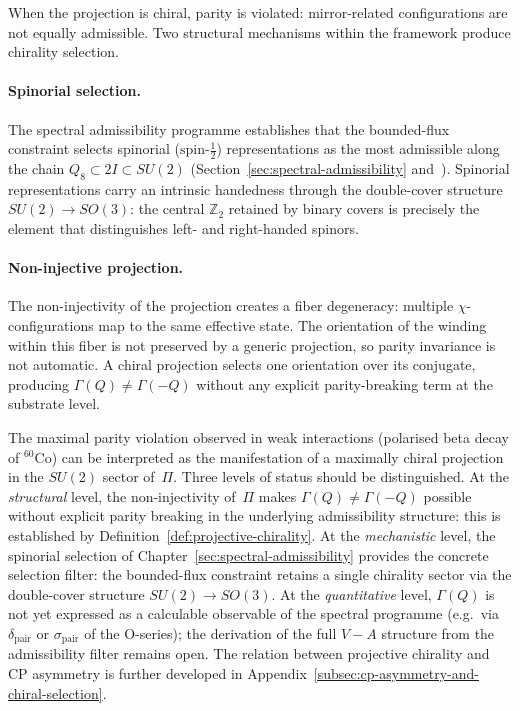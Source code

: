     When the projection is chiral, parity is violated: mirror-related
    configurations are not equally admissible.
    Two structural mechanisms within the framework produce chirality selection.

    \paragraph{Spinorial selection.}
      The spectral admissibility programme establishes that the bounded-flux
      constraint selects spinorial ($\mathrm{spin}$-$\tfrac{1}{2}$) representations
      as the most admissible along the chain $Q_8 \subset 2I \subset SU(2)$
      (Section~\ref{sec:spectral-admissibility} and~\cite{Beau2026a1}).
      Spinorial representations carry an intrinsic handedness through the
      double-cover structure $SU(2) \to SO(3)$: the central $\mathbb{Z}_2$
      retained by binary covers is precisely the element that distinguishes
      left- and right-handed spinors.

    \paragraph{Non-injective projection.}
      The non-injectivity of the projection creates a fiber degeneracy:
      multiple $\chi$-configurations map to the same effective state.
      The orientation of the winding within this fiber is not preserved by a
      generic projection, so parity invariance is not automatic.
      A chiral projection selects one orientation over its conjugate, producing
      $\Gamma(Q) \neq \Gamma(-Q)$ without any explicit parity-breaking term at
      the substrate level.

      The maximal parity violation observed in weak interactions (polarised beta
      decay of ${}^{60}\mathrm{Co}$) can be interpreted as the manifestation of a
      maximally chiral projection in the $SU(2)$ sector of~$\Pi$.
      Three levels of status should be distinguished.
      At the \emph{structural} level, the non-injectivity of~$\Pi$ makes
      $\Gamma(Q) \neq \Gamma(-Q)$ possible without explicit parity breaking
      in the underlying admissibility structure: this is established by
      Definition~\ref{def:projective-chirality}.
      At the \emph{mechanistic} level, the spinorial selection of
      Chapter~\ref{sec:spectral-admissibility} provides the concrete selection
      filter: the bounded-flux constraint retains a single chirality sector
      via the double-cover structure $SU(2) \to SO(3)$.
      At the \emph{quantitative} level, $\Gamma(Q)$ is not yet expressed as a
      calculable observable of the spectral programme (e.g.\ via
      $\delta_{\mathrm{pair}}$ or $\sigma_{\mathrm{pair}}$ of the O-series);
      the derivation of the full $V{-}A$ structure from the admissibility filter
      remains open.
      The relation between projective chirality and CP asymmetry is further
      developed in Appendix~\ref{subsec:cp-asymmetry-and-chiral-selection}.

